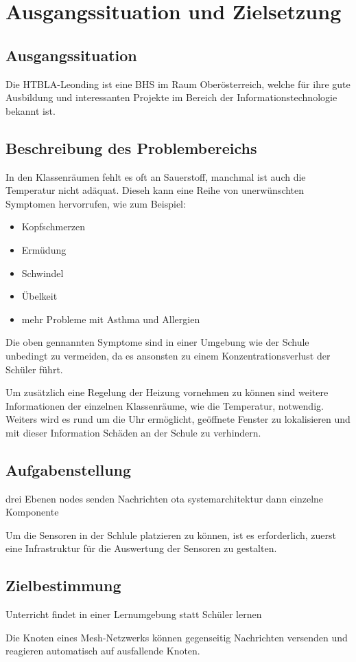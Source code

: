 \chapter{Ausgangssituation und Zielsetzung}

\section{Ausgangssituation}
Die HTBLA-Leonding ist eine BHS im Raum Oberösterreich, welche für ihre gute Ausbildung und interessanten Projekte im Bereich der Informationstechnologie bekannt ist.

\section{Beschreibung des Problembereichs}
In den Klassenräumen fehlt es oft an Sauerstoff, manchmal ist auch die Temperatur nicht adäquat. Dieseh kann eine Reihe von unerwünschten Symptomen hervorrufen, wie zum Beispiel: 

\begin{itemize}
    \item Kopfschmerzen
    \item Ermüdung
    \item Schwindel
    \item Übelkeit
    \item mehr Probleme mit Asthma und Allergien
\end{itemize}

Die oben gennannten Symptome sind in einer Umgebung wie der Schule unbedingt zu vermeiden, da es ansonsten zu einem Konzentrationsverlust der Schüler führt.

Um zusätzlich eine Regelung der Heizung vornehmen zu können sind weitere Informationen der einzelnen Klassenräume, wie die Temperatur, notwendig. Weiters wird es rund um die Uhr ermöglicht,  geöffnete Fenster zu lokalisieren und mit dieser Information Schäden an der Schule zu verhindern.

\section{Aufgabenstellung}
drei Ebenen
nodes senden Nachrichten
ota
systemarchitektur
dann einzelne Komponente


Um die Sensoren in der Schlule platzieren zu können, ist es erforderlich, zuerst eine Infrastruktur für die Auswertung der Sensoren zu gestalten.

\section{Zielbestimmung}
Unterricht findet in einer Lernumgebung statt
Schüler lernen

Die Knoten eines Mesh-Netzwerks können gegenseitig Nachrichten versenden und reagieren automatisch auf ausfallende Knoten.
